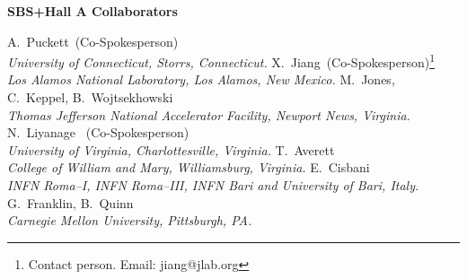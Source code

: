 
\centerline{\Large\bf SBS+Hall A Collaborators}
\vskip 0.3in

\begin{center}
\vskip 0.15in
A.~Puckett~(Co-Spokesperson) \\
{\it University of Connecticut,  Storrs, Connecticut.}
%
\vskip 0.15in
X.~Jiang~(Co-Spokesperson)\footnote{Contact person. Email: jiang@jlab.org}  \\
 {\it  Los Alamos National Laboratory, Los Alamos, New Mexico.}
\vskip 0.15in
M.~Jones, C.~Keppel,  B.~Wojtsekhowski  \\
{\it  Thomas Jefferson National Accelerator Facility, Newport News, Virginia.}
%
\vskip 0.15in
N.~Liyanage ~(Co-Spokesperson)\\ 
%  
{\it University of Virginia, Charlottesville, Virginia.}
%
\vskip 0.15in
T.~Averett \\
{\it  College of William and Mary, Williamsburg, Virginia.}
%
\vskip 0.15in
E.~Cisbani \\ 
{\it INFN Roma--I, INFN Roma--III, INFN Bari and University of Bari,
  Italy.} 
\vskip 0.15in
G.~Franklin, B.~Quinn \\
{\it Carnegie Mellon University, Pittsburgh, PA.} 
\end{center}
